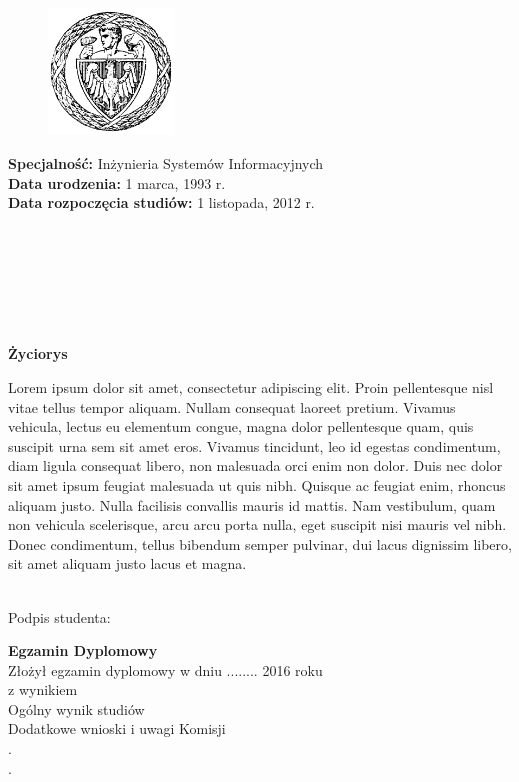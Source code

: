\begin{figure}
  \vspace{-20pt}
  \begin{center}
    \includegraphics[width=0.30\textwidth]{tytulowa_res/logo_pw.png}
  \end{center}
  \vspace{-20pt}
\end{figure}

\noindent
\textbf{Specjalność: }Inżynieria Systemów Informacyjnych\\
\textbf{Data urodzenia: }1 marca, 1993 r.\\
\textbf{Data rozpoczęcia studiów: }1 listopada, 2012 r. \ \\\\\\\\\\\\\\

\begin{center}
    \large{\textbf{Życiorys}}
\end{center}
Lorem ipsum dolor sit amet, consectetur adipiscing elit. Proin pellentesque nisl vitae tellus tempor aliquam. Nullam consequat laoreet pretium. Vivamus vehicula, lectus eu elementum congue, magna dolor pellentesque quam, quis suscipit urna sem sit amet eros. Vivamus tincidunt, leo id egestas condimentum, diam ligula consequat libero, non malesuada orci enim non dolor. Duis nec dolor sit amet ipsum feugiat malesuada ut quis nibh. Quisque ac feugiat enim, rhoncus aliquam justo. Nulla facilisis convallis mauris id mattis. Nam vestibulum, quam non vehicula scelerisque, arcu arcu porta nulla, eget suscipit nisi mauris vel nibh. Donec condimentum, tellus bibendum semper pulvinar, dui lacus dignissim libero, sit amet aliquam justo lacus et magna.\\\\

\begin{flushright}
    \begin{minipage}{.5\linewidth}
        \dotfill
        \begin{flushright}
            Podpis studenta:
        \end{flushright}
    \end{minipage}
\end{flushright}

\vfill

\noindent
\large{\textbf{Egzamin Dyplomowy}}\\
Złożył egzamin dyplomowy w dniu ........ 2016 roku\\
z wynikiem \dotfill\\
Ogólny wynik studiów \dotfill\\
Dodatkowe wnioski i uwagi Komisji \dotfill\\
.\dotfill\\
.\dotfill
